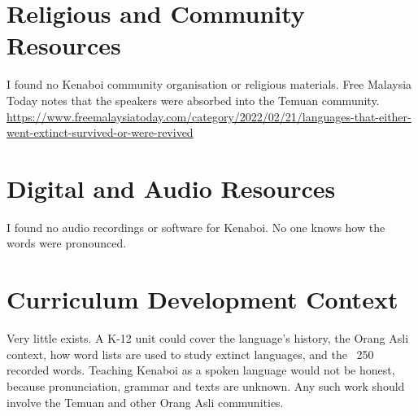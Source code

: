 \documentclass[12pt]{article}
\begin{document}
\section{Religious and Community Resources}
I found no Kenaboi community organisation or religious materials. Free Malaysia Today notes that the speakers were absorbed into the Temuan community. \url{https://www.freemalaysiatoday.com/category/2022/02/21/languages-that-either-went-extinct-survived-or-were-revived}

\section{Digital and Audio Resources}
I found no audio recordings or software for Kenaboi. No one knows how the words were pronounced.

\section{Curriculum Development Context}
Very little exists. A K-12 unit could cover the language's history, the Orang Asli context, how word lists are used to study extinct languages, and the ~250 recorded words. Teaching Kenaboi as a spoken language would not be honest, because pronunciation, grammar and texts are unknown. Any such work should involve the Temuan and other Orang Asli communities.
\end{document}
